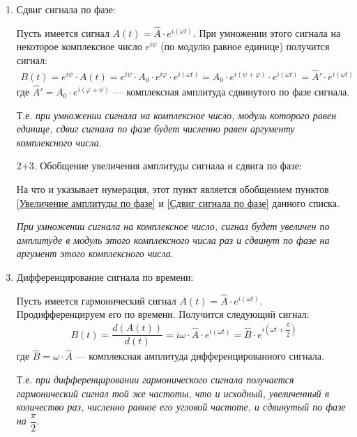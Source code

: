 \documentclass[a4paper, usenames, dvipsnames]{article}
\begin{document}
\begin{enumerate}
    \item Сдвиг сигнала по фазе:\label{Сдвиг сигнала по фазе}

          Пусть имеется сигнал $A(t) = \hat{A} \cdot e^{i(\omega t)}$.
          При умножении этого сигнала на некоторое комплексное число $e^{i\psi}$
          (по модулю равное единице) получится сигнал:
          \begin{gather*}
              B(t) = e^{i\psi} \cdot A(t) = e^{i\psi} \cdot A_0 \cdot e^{i\varphi} \cdot e^{i(\omega t)}
              = A_0 \cdot e^{i(\psi + \varphi)} \cdot e^{i(\omega t)} = \hat{A}' \cdot e^{i(\omega t)}
          \end{gather*}
          где $\hat{A}' = A_0 \cdot e^{i(\varphi + \psi)}$ --- комплексная амплитуда сдвинутого
          по фазе сигнала.

          Т.е. {\it при умножении сигнала на комплексное число, модуль которого равен единице,
          сдвиг сигнала по фазе будет численно равен аргументу комплексного числа}.

    \item[2+3.] Обобщение увеличения амплитуды сигнала и сдвига по фазе:

        На что и указывает нумерация, этот пункт является
        обобщением пунктов \ref{Увеличение амплитуды по фазе}
        и \ref{Сдвиг сигнала по фазе} данного списка.

        {\it При умножении сигнала на комплексное число, сигнал будет увеличен по амплитуде
        в модуль этого комплексного числа раз
        и сдвинут по фазе на аргумент этого комплексного числа}.

    \item Дифференцирование сигнала по времени:

          Пусть имеется гармонический сигнал $A(t) = \hat{A} \cdot e^{i(\omega t)}$.
          Продифференцируем его по времени. Получится следующий сигнал:
          \begin{gather*}
              B(t) = \dfrac{d(A(t))}{d(t)} = i\omega \cdot \hat{A} \cdot e^{i(\omega t)}
              = \hat{B} \cdot e^{i\left(\omega t + \dfrac{\pi}{2}\right)}
          \end{gather*}
          где $\hat{B} = \omega \cdot \hat{A}$ --- комплексная амплитуда дифференцированного сигнала.

          Т.е. {\it при дифференцировании гармонического сигнала получается
          гармонический сигнал той же частоты, что и исходный,
          увеличенный в количество раз, численно равное его угловой частоте,
          и сдвинутый по фазе на $\dfrac{\pi}{2}$}.


\end{enumerate}
\end{document}
